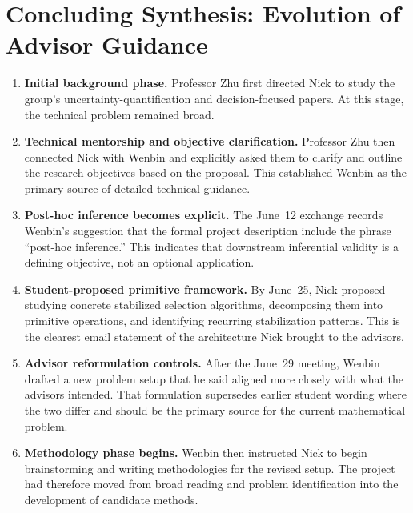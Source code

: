 \documentclass[11pt]{article}
\begin{document}
\clearpage
\section*{Concluding Synthesis: Evolution of Advisor Guidance}
\begin{enumerate}[leftmargin=*,itemsep=0.6em]
  \item \textbf{Initial background phase.}
        Professor Zhu first directed Nick to study the group's
        uncertainty-quantification and decision-focused papers. At this stage,
        the technical problem remained broad.

  \item \textbf{Technical mentorship and objective clarification.}
        Professor Zhu then connected Nick with Wenbin and explicitly asked them
        to clarify and outline the research objectives based on the proposal.
        This established Wenbin as the primary source of detailed technical
        guidance.

  \item \textbf{Post-hoc inference becomes explicit.}
        The June~12 exchange records Wenbin's suggestion that the formal
        project description include the phrase ``post-hoc inference.'' This
        indicates that downstream inferential validity is a defining objective,
        not an optional application.

  \item \textbf{Student-proposed primitive framework.}
        By June~25, Nick proposed studying concrete stabilized selection
        algorithms, decomposing them into primitive operations, and identifying
        recurring stabilization patterns. This is the clearest email statement
        of the architecture Nick brought to the advisors.

  \item \textbf{Advisor reformulation controls.}
        After the June~29 meeting, Wenbin drafted a new problem setup that he
        said aligned more closely with what the advisors intended. That
        formulation supersedes earlier student wording where the two differ and
        should be the primary source for the current mathematical problem.

  \item \textbf{Methodology phase begins.}
        Wenbin then instructed Nick to begin brainstorming and writing
        methodologies for the revised setup. The project had therefore moved
        from broad reading and problem identification into the development of
        candidate methods.
\end{enumerate}
\end{document}
